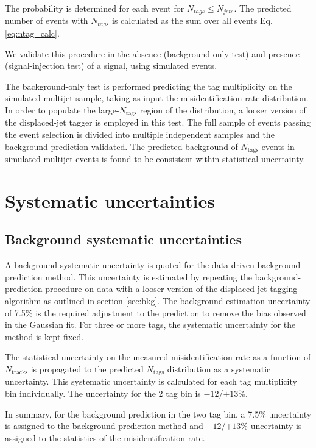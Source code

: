 The probability is determined for each event for $N_{tags} \leq N_{jets}$. The predicted number of events with
$N_{tags}$ is calculated as the sum over all events Eq. \ref{eq:ntag_calc}. 

We validate this procedure in the absence (background-only test) and
presence (signal-injection test) of a signal, using simulated events.

The background-only test is performed predicting the tag multiplicity
on the simulated multijet sample, taking as input the misidentification rate
distribution. In order to populate the large-$N_{\textrm{tags}}$
region of the distribution, a looser version of the displaced-jet
tagger is employed in this test. The full sample of events passing the
event selection is divided into multiple independent samples and the background
prediction validated. The predicted background of $N_{\textrm{tags}}$ events
in simulated multijet events is found to be consistent within statistical uncertainty. 




\section{Systematic uncertainties}
\label{sec:sys}

\subsection{Background systematic uncertainties}
\label{sec:bkgsys}

A background systematic uncertainty is quoted for the data-driven background prediction
method. This uncertainty is estimated by repeating the
background-prediction procedure on data with a looser version of the
displaced-jet tagging algorithm as outlined in section \ref{sec:bkg}.  The
background estimation uncertainty of 7.5\% is the required adjustment
to the prediction to remove the bias observed in the Gaussian fit.  For three or more tags, the systematic uncertainty for the
method is kept fixed.

The statistical uncertainty on the measured misidentification rate as a
function of $N_{\textrm{tracks}}$ is propagated to the predicted
$N_{\textrm{tags}}$ distribution as a systematic uncertainty. This systematic uncertainty 
is calculated for each tag multiplicity bin individually. The uncertainty for the 2 tag
bin is ${-}12$/$+13$\%.

In summary, for the background prediction in the two tag bin, a 7.5\% uncertainty is assigned to the
background prediction method and ${-}12$/$+13$\% uncertainty is assigned to 
the statistics of the misidentification rate. 

